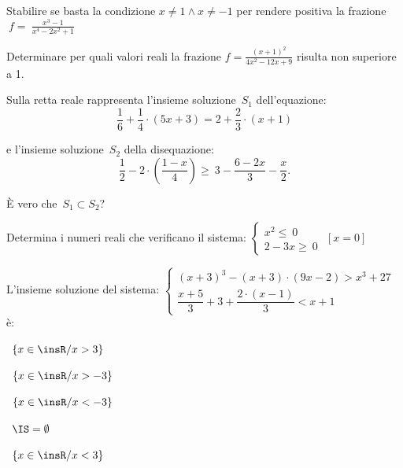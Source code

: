 \begin{esercizio}
 \label{ese:4.73}
Stabilire se basta la condizione $x\neq 1\wedge x\neq -1$ per rendere positiva 
la frazione $~f=~\frac{x^3-1}{x^4-2x^2+1}$
\end{esercizio}

\begin{esercizio}
 \label{ese:4.74}
Determinare per quali valori reali la frazione $f=\frac{(x+1)^2}{4x^2-12x+9}$ 
risulta non superiore a 1.
\end{esercizio}


\begin{esercizio}
 \label{ese:21.33}
Sulla retta reale rappresenta l'insieme soluzione~$S_{1}$
dell'equazione:
\[\frac{1}{6}+\frac{1}{4}\cdot (5x+3)=2+\frac{2}{3}\cdot (x+1)\]

e l'insieme soluzione~$S_{2}$ della disequazione:
\[\frac{1}{2}-2\cdot\left(\frac{1-x}{4}\right)\ge~3-\frac{6-2x}{3}-\frac{x}{2}.\]

È vero che~$S_{1}\subset S_{2}$?
\end{esercizio}

\begin{esercizio}[\Ast]
 \label{ese:21.34}
 Determina i numeri reali che verificano il sistema:
 $\left\{%
  \begin{array}{l}
  x^{2}\le~0
  \\2-3x\ge~0
 \end{array}\right.$
\hfill $\left[x = 0\right]$
 \end{esercizio}

\begin{esercizio}
 \label{ese:21.35}
 L'insieme soluzione del sistema:
$\left\{\begin{array}{l}
  (x+3)^{3}-(x+3)\cdot (9x-2)>x^{3}+27\\
  \dfrac{x+5}{3}+3+\dfrac{2\cdot (x-1)}{3}<x+1
 \end{array}\right.$ è:
\begin{multicols}{2}
\boxA\quad~$\left\{x\in \insR/x>3\right\}$

\boxB\quad~$\left\{x\in \insR/x>-3\right\}$

\boxC\quad~$\left\{x\in \insR/x<-3\right\}$

\boxD\quad~$\IS=\emptyset $

\boxE\quad~$\left\{x\in\insR/x<3\right\}$
\end{multicols}

\end{esercizio}

